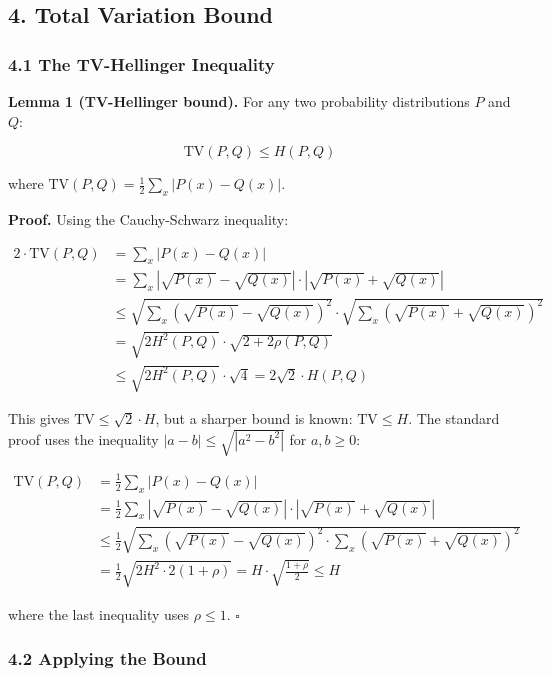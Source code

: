 \documentclass[
  12pt,
]{article}
\begin{document}
\subsection{4. Total Variation Bound}\label{total-variation-bound}

\subsubsection{4.1 The TV-Hellinger
Inequality}\label{the-tv-hellinger-inequality}

\textbf{Lemma 1 (TV-Hellinger bound).} For any two probability
distributions \(P\) and \(Q\):

\[\text{TV}(P, Q) \leq H(P, Q)\]

where \(\text{TV}(P, Q) = \frac12 \sum_x |P(x) - Q(x)|\).

\textbf{Proof.} Using the Cauchy-Schwarz inequality:

\[\begin{aligned}
2\cdot\text{TV}(P, Q) &= \sum_x |P(x) - Q(x)| \\
&= \sum_x |\sqrt{P(x)} - \sqrt{Q(x)}| \cdot |\sqrt{P(x)} + \sqrt{Q(x)}| \\
&\leq \sqrt{\sum_x (\sqrt{P(x)} - \sqrt{Q(x)})^2} \cdot \sqrt{\sum_x (\sqrt{P(x)} + \sqrt{Q(x)})^2} \\
&= \sqrt{2H^2(P,Q)} \cdot \sqrt{2 + 2\rho(P,Q)} \\
&\leq \sqrt{2H^2(P,Q)} \cdot \sqrt{4} = 2\sqrt{2} \cdot H(P,Q)
\end{aligned}\]

This gives \(\text{TV} \leq \sqrt{2} \cdot H\), but a sharper bound is
known: \(\text{TV} \leq H\). The standard proof uses the inequality
\(|a-b| \leq \sqrt{|a^2-b^2|}\) for \(a,b \geq 0\):

\[\begin{aligned}
\text{TV}(P,Q) &= \frac12 \sum_x |P(x) - Q(x)| \\
&= \frac12 \sum_x |\sqrt{P(x)} - \sqrt{Q(x)}| \cdot |\sqrt{P(x)} + \sqrt{Q(x)}| \\
&\leq \frac12 \sqrt{\sum_x (\sqrt{P(x)} - \sqrt{Q(x)})^2 \cdot \sum_x (\sqrt{P(x)} + \sqrt{Q(x)})^2} \\
&= \frac12 \sqrt{2H^2 \cdot 2(1+\rho)} = H \cdot \sqrt{\frac{1+\rho}{2}} \leq H
\end{aligned}\]

where the last inequality uses \(\rho \leq 1\). \(\square\)

\subsubsection{4.2 Applying the Bound}\label{applying-the-bound}
\end{document}
